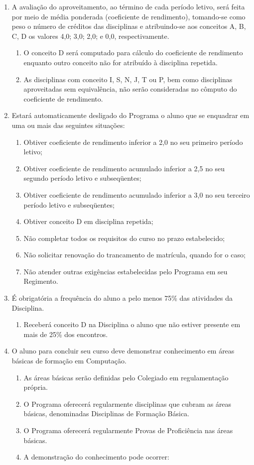 \documentclass{article}
\newcommand{\singleitem}{\item[Parágrafo Único.]}
\newcommand{\grupoMenor}{Colegiado\xspace}
\begin{document}
\begin{enumerate}
	\item A avaliação do aproveitamento, ao término de cada período letivo, será feita por meio de média ponderada (coeficiente de rendimento), tomando-se como peso o número de créditos das disciplinas e atribuindo-se aos conceitos A, B, C, D os valores 4,0; 3,0; 2,0; e 0,0, respectivamente.

	\begin{enumerate}
		\item O conceito D será computado para cálculo do coeficiente de rendimento enquanto outro conceito não for atribuído à disciplina repetida.
		\item As disciplinas com conceito I, S, N, J, T ou P, bem como disciplinas aproveitadas sem equivalência, não serão consideradas no cômputo do coeficiente de rendimento.
	\end{enumerate}

	\item Estará automaticamente desligado do Programa o aluno que se enquadrar em uma ou mais das seguintes situações:
	\begin{enumerate}[label=\Roman*]
		\item Obtiver coeficiente de rendimento inferior a 2,0 no seu primeiro período letivo;
		\item Obtiver coeficiente de rendimento acumulado inferior a 2,5 no seu segundo período letivo e subseqüentes;
		\item Obtiver coeficiente de rendimento acumulado inferior a 3,0 no seu terceiro período letivo e subseqüentes;
		\item Obtiver conceito D em disciplina repetida;
		\item Não completar todos os requisitos do curso no prazo estabelecido;
		\item Não solicitar renovação do trancamento de matrícula, quando for o caso;
		\item Não atender outras exigências estabelecidas pelo Programa em seu Regimento.
	\end{enumerate}

	\item  É obrigatória a frequência do aluno a pelo menos 75\% das atividades da Disciplina.
	\begin{enumerate}
		\singleitem Receberá conceito D na Disciplina o aluno que não estiver presente em mais de 25\% dos encontros.
	\end{enumerate}

	\item O aluno para concluir seu curso deve demonstrar conhecimento em áreas básicas de formação em Computação.
	\begin{enumerate}
		\item As áreas básicas serão definidas pelo \grupoMenor em regulamentação própria.
		\item O Programa oferecerá regularmente disciplinas que cubram as áreas básicas, denominadas Disciplinas de Formação Básica.
		\item O Programa oferecerá regularmente Provas de Proficiência nas áreas básicas.
		\item A demonstração do conhecimento pode ocorrer:


\end{enumerate}
\end{enumerate}
\end{document}
